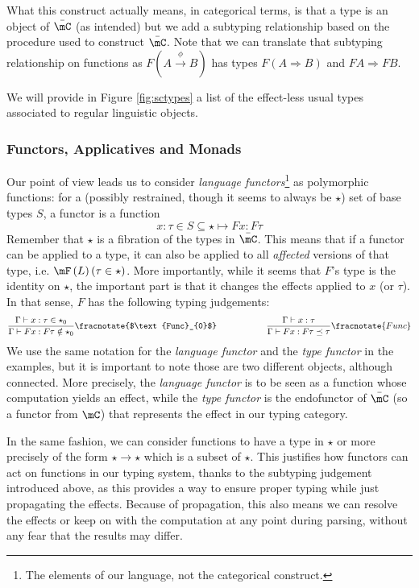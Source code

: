 What this construct actually means, in categorical terms, is that a type is an
object of $\bar{\mC}$ (as intended) but we add a subtyping relationship based
on the procedure used to construct $\bar{\mC}$.
Note that we can translate that subtyping relationship on functions as
$F\left( A \xrightarrow{\phi} B \right)$ has types
$F\left( A\Rightarrow B \right)$ and $FA \Rightarrow FB$.

We will provide in Figure \ref{fig:sctypes} a list of the effect-less usual
types associated to regular linguistic objects.

\subsubsection{Functors, Applicatives and Monads}
\label{subsubsec:functors}
Our point of view leads us to consider \emph{language functors}\footnote{The
	elements of our language, not the categorical construct.} as polymorphic
functions: for a (possibly restrained, though it seems to always be $\star$)
set of base types $S$, a functor is a function
\begin{equation*}
	x: \tau\in S\subseteq \star \mapsto F x: F\tau
\end{equation*}
Remember that $\star$ is a fibration of the types in $\bar{\mC}$.
This means that if a functor can be applied to a type, it can also be applied
to all \emph{affected} versions of that type, i.e.
$\mF\left( L \right)(\tau\in \star)$.
More importantly, while it seems that $F$'s type is the identity on $\star$,
the important part is that it changes the effects applied to $x$ (or $\tau$).
In that sense, $F$ has the following typing judgements:
\begin{equation*}
	\frac{\Gamma\vdash x: \tau \in \star_{0}}{\Gamma\vdash F x: F\tau \notin
		\star_{0}}\fracnotate{$\text{Func}_{0}$} \hspace{2cm} \frac{\Gamma\vdash x:
		\tau}{\Gamma\vdash Fx : F\tau\preceq \tau}\fracnotate{Func}
\end{equation*}
We use the same notation for the \emph{language functor} and the
\emph{type functor} in the examples, but it is important to note those are two
different objects, although connected.
More precisely, the \emph{language functor} is to be seen as a function whose
computation yields an effect, while the \emph{type functor} is the endofunctor
of $\bar{\mC}$ (so a functor from $\mC$) that represents the effect in our
typing category.

In the same fashion, we can consider functions to have a type in $\star$ or
more precisely of the form $\star \to \star$ which is a subset of $\star$.
This justifies how functors can act on functions in our typing system, thanks
to the subtyping judgement introduced above, as this provides a way to ensure
proper typing while just propagating the effects.
Because of propagation, this also means we can resolve the effects or keep on
with the computation at any point during parsing, without any fear that the
results may differ.

